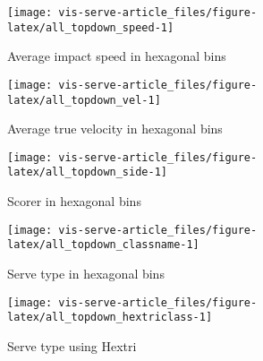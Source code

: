 \documentclass[article]{jss}
\begin{document}
\begin{CodeChunk}
\begin{figure}

{\centering \texttt{[image: vis-serve-article\_files/figure-latex/all\_topdown\_speed-1]} 

}

\caption[Average impact speed in hexagonal bins]{Average impact speed in hexagonal bins}\label{fig:all_topdown_speed}
\end{figure}
\end{CodeChunk}

\begin{CodeChunk}
\begin{figure}

{\centering \texttt{[image: vis-serve-article\_files/figure-latex/all\_topdown\_vel-1]} 

}

\caption[Average true velocity in hexagonal bins]{Average true velocity in hexagonal bins}\label{fig:all_topdown_vel}
\end{figure}
\end{CodeChunk}

\begin{CodeChunk}
\begin{figure}

{\centering \texttt{[image: vis-serve-article\_files/figure-latex/all\_topdown\_side-1]} 

}

\caption[Scorer in hexagonal bins]{Scorer in hexagonal bins}\label{fig:all_topdown_side}
\end{figure}
\end{CodeChunk}

\begin{CodeChunk}
\begin{figure}

{\centering \texttt{[image: vis-serve-article\_files/figure-latex/all\_topdown\_classname-1]} 

}

\caption[Serve type in hexagonal bins]{Serve type in hexagonal bins}\label{fig:all_topdown_classname}
\end{figure}
\end{CodeChunk}

\begin{CodeChunk}
\begin{figure}

{\centering \texttt{[image: vis-serve-article\_files/figure-latex/all\_topdown\_hextriclass-1]} 

}

\caption[Serve type using Hextri]{Serve type using Hextri}\label{fig:all_topdown_hextriclass}
\end{figure}
\end{CodeChunk}
\end{document}

